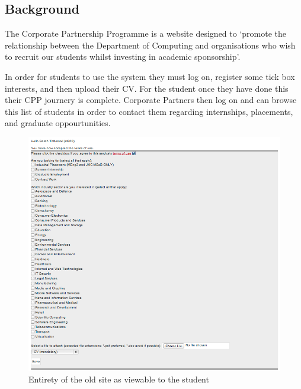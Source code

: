 \subsection{Background}
The Corporate Partnership Programme is a website designed to `promote the relationship between the Department of Computing and organisations who wish to recruit our students whilst investing in academic sponsorship'\cite{doc-cpp}.

In order for students to use the system they must log on, register some tick box interests, and then upload their CV.
For the student once they have done this their CPP journery is complete.
Corporate Partners then log on and can browse this list of students in order to contact them regarding internships, placements, and graduate oppourtunities.

\begin{figure}[H]\centering
\includegraphics[scale=0.5]{images/introduction/old_cpp}
\caption{Entirety of the old site as viewable to the student}
\end{figure}
